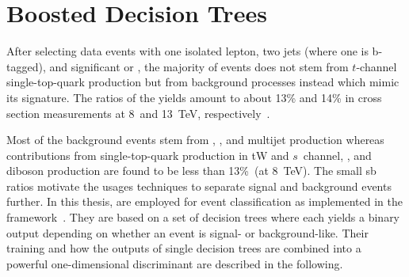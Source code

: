 

\section{Boosted Decision Trees}

After selecting data events with one isolated lepton, two jets (where one is b-tagged), and significant \met or \mtw, the majority of events does not stem from $t$-channel single-top-quark production but from background processes instead which mimic its signature. The ratios of the  yields amount to about 13\% and 14\% in cross section measurements at 8~and 13~TeV, respectively~\cite{Khachatryan:2014iya,Sirunyan:2016cdg}. 

Most of the background events stem from \wjets, \ttbar, and multijet production whereas contributions from single-top-quark production in tW and $s$~channel, \zjets, and diboson production are found to be less than 13\%~(at 8~TeV).  The small \gls{sb} ratios motivate the usages  techniques to separate signal and background events further. In this thesis,  are employed for event classification as implemented in the \TMVA[format=hyperbf] framework~\cite{Hocker:2007ht}. They are based on a set of decision trees where each yields a binary output depending on whether an event is signal- or background-like. Their training and how the outputs of single decision trees are combined into a powerful one-dimensional discriminant are described in the following.

